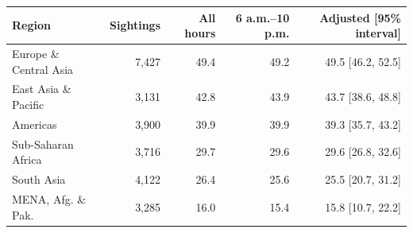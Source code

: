 \begin{tabular}{@{}lrrrr@{}}
\toprule
Region & Sightings & All hours & 6 a.m.–10 p.m. & Adjusted [95\% interval] \\
\midrule
Europe \& Central Asia & 7,427 & 49.4 & 49.2 & 49.5 [46.2, 52.5] \\
East Asia \& Pacific & 3,131 & 42.8 & 43.9 & 43.7 [38.6, 48.8] \\
Americas & 3,900 & 39.9 & 39.9 & 39.3 [35.7, 43.2] \\
Sub-Saharan Africa & 3,716 & 29.7 & 29.6 & 29.6 [26.8, 32.6] \\
South Asia & 4,122 & 26.4 & 25.6 & 25.5 [20.7, 31.2] \\
MENA, Afg. \& Pak. & 3,285 & 16.0 & 15.4 & 15.8 [10.7, 22.2] \\
\bottomrule
\end{tabular}
